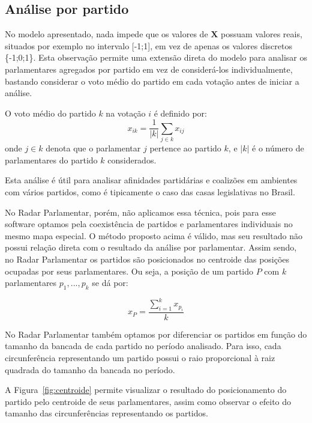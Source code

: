\documentclass[a4paper, 12pt]{article}
\begin{document}
\subsection*{Análise por partido}

No modelo apresentado, nada impede que os valores de $\mathbf{X}$ possuam valores reais, situados por exemplo no intervalo [-1;1], em vez de apenas os valores discretos \{-1;0;1\}. Esta observação permite uma extensão direta do modelo para analisar os parlamentares agregados por partido em vez de considerá-los individualmente, bastando considerar o voto médio do partido em cada votação antes de iniciar a análise.

O voto médio do partido $k$ na votação $i$ é definido por:
\begin{equation}
  x_{ik} = \frac{1}{|k|}\sum_{j\in k} x_{ij}
  \label{eq:voto-partido}
\end{equation}
onde $j \in k$ denota que o parlamentar $j$ pertence ao partido $k$, e $|k|$ é o número de parlamentares do partido $k$ considerados.

Esta análise é útil para analisar afinidades partidárias e coalizões em ambientes com vários partidos, como é tipicamente o caso das casas legislativas no Brasil.

No Radar Parlamentar, porém, não aplicamos essa técnica, pois para esse software optamos pela coexistência de partidos e parlamentares individuais no mesmo mapa especial. O método proposto acima é válido, mas seu resultado não possui relação direta com o resultado da análise por parlamentar. Assim sendo, no Radar Parlamentar os partidos são posicionados no centroide das posições ocupadas por seus parlamentares. Ou seja, a posição de um partido $P$ com $k$ parlamentares $p_1, ..., p_k$ se dá por:

\begin{equation}
  x_{P} = \frac{\sum_{i=1}^{k}{x_{p_i}}}{k}
  \label{eq:partido-centroide}
\end{equation}

No Radar Parlamentar também optamos por diferenciar os partidos em função do tamanho da bancada de cada partido no período analisado. Para isso, cada circunferência representando um partido possui o raio proporcional à raiz quadrada do tamanho da bancada no período.

A Figura~\ref{fig:centroide} permite visualizar o resultado do posicionamento do partido pelo centroide de seus parlamentares, assim como observar o efeito do tamanho das circunferências representando os partidos.
\end{document}
